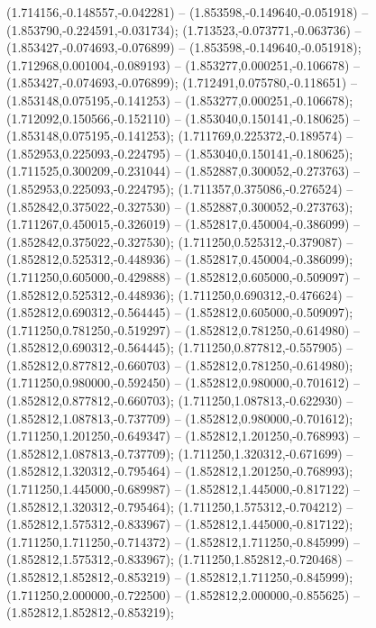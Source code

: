  (1.714156,-0.148557,-0.042281) -- (1.853598,-0.149640,-0.051918) -- (1.853790,-0.224591,-0.031734);
 (1.713523,-0.073771,-0.063736) -- (1.853427,-0.074693,-0.076899) -- (1.853598,-0.149640,-0.051918);
 (1.712968,0.001004,-0.089193) -- (1.853277,0.000251,-0.106678) -- (1.853427,-0.074693,-0.076899);
 (1.712491,0.075780,-0.118651) -- (1.853148,0.075195,-0.141253) -- (1.853277,0.000251,-0.106678);
 (1.712092,0.150566,-0.152110) -- (1.853040,0.150141,-0.180625) -- (1.853148,0.075195,-0.141253);
 (1.711769,0.225372,-0.189574) -- (1.852953,0.225093,-0.224795) -- (1.853040,0.150141,-0.180625);
 (1.711525,0.300209,-0.231044) -- (1.852887,0.300052,-0.273763) -- (1.852953,0.225093,-0.224795);
 (1.711357,0.375086,-0.276524) -- (1.852842,0.375022,-0.327530) -- (1.852887,0.300052,-0.273763);
 (1.711267,0.450015,-0.326019) -- (1.852817,0.450004,-0.386099) -- (1.852842,0.375022,-0.327530);
 (1.711250,0.525312,-0.379087) -- (1.852812,0.525312,-0.448936) -- (1.852817,0.450004,-0.386099);
 (1.711250,0.605000,-0.429888) -- (1.852812,0.605000,-0.509097) -- (1.852812,0.525312,-0.448936);
 (1.711250,0.690312,-0.476624) -- (1.852812,0.690312,-0.564445) -- (1.852812,0.605000,-0.509097);
 (1.711250,0.781250,-0.519297) -- (1.852812,0.781250,-0.614980) -- (1.852812,0.690312,-0.564445);
 (1.711250,0.877812,-0.557905) -- (1.852812,0.877812,-0.660703) -- (1.852812,0.781250,-0.614980);
 (1.711250,0.980000,-0.592450) -- (1.852812,0.980000,-0.701612) -- (1.852812,0.877812,-0.660703);
 (1.711250,1.087813,-0.622930) -- (1.852812,1.087813,-0.737709) -- (1.852812,0.980000,-0.701612);
 (1.711250,1.201250,-0.649347) -- (1.852812,1.201250,-0.768993) -- (1.852812,1.087813,-0.737709);
 (1.711250,1.320312,-0.671699) -- (1.852812,1.320312,-0.795464) -- (1.852812,1.201250,-0.768993);
 (1.711250,1.445000,-0.689987) -- (1.852812,1.445000,-0.817122) -- (1.852812,1.320312,-0.795464);
 (1.711250,1.575312,-0.704212) -- (1.852812,1.575312,-0.833967) -- (1.852812,1.445000,-0.817122);
 (1.711250,1.711250,-0.714372) -- (1.852812,1.711250,-0.845999) -- (1.852812,1.575312,-0.833967);
 (1.711250,1.852812,-0.720468) -- (1.852812,1.852812,-0.853219) -- (1.852812,1.711250,-0.845999);
 (1.711250,2.000000,-0.722500) -- (1.852812,2.000000,-0.855625) -- (1.852812,1.852812,-0.853219);

